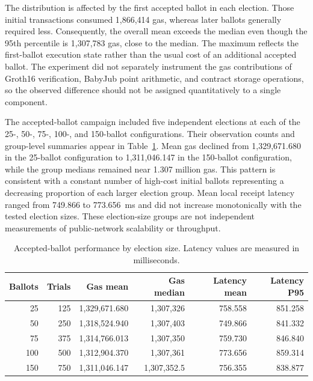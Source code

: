 The distribution is affected by the first accepted ballot in each election. Those initial transactions consumed 1,866,414 gas, whereas later ballots generally required less. Consequently, the overall mean exceeds the median even though the 95th percentile is 1,307,783 gas, close to the median. The maximum reflects the first-ballot execution state rather than the usual cost of an additional accepted ballot. The experiment did not separately instrument the gas contributions of Groth16 verification, BabyJub point arithmetic, and contract storage operations, so the observed difference should not be assigned quantitatively to a single component.

The accepted-ballot campaign included five independent elections at each of the 25-, 50-, 75-, 100-, and 150-ballot configurations. Their observation counts and group-level summaries appear in Table~\ref{tab:results-accepted-scale}. Mean gas declined from 1,329,671.680 in the 25-ballot configuration to 1,311,046.147 in the 150-ballot configuration, while the group medians remained near 1.307 million gas. This pattern is consistent with a constant number of high-cost initial ballots representing a decreasing proportion of each larger election group. Mean local receipt latency ranged from 749.866 to 773.656~ms and did not increase monotonically with the tested election sizes. These election-size groups are not independent measurements of public-network scalability or throughput.

\begin{table}[t]
\centering
\caption{Accepted-ballot performance by election size.
Latency values are measured in milliseconds.}
\label{tab:results-accepted-scale}
\scriptsize
\setlength{\tabcolsep}{3pt}
\begin{tabular}{@{}rrrrrr@{}}
\toprule
\textbf{Ballots} &
\textbf{Trials} &
\textbf{Gas mean} &
\textbf{Gas median} &
\textbf{Latency mean} &
\textbf{Latency P95} \\
\midrule
25
& 125
& 1,329,671.680
& 1,307,326
& 758.558
& 851.258 \\
50
& 250
& 1,318,524.940
& 1,307,403
& 749.866
& 841.332 \\
75
& 375
& 1,314,766.013
& 1,307,350
& 759.730
& 846.840 \\
100
& 500
& 1,312,904.370
& 1,307,361
& 773.656
& 859.314 \\
150
& 750
& 1,311,046.147
& 1,307,352.5
& 756.355
& 838.877 \\
\bottomrule
\end{tabular}
\end{table}

